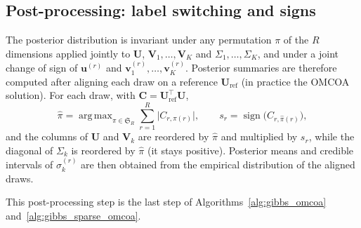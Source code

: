 \documentclass[11pt]{article}
\newtheorem{remark}{Remark}
\DeclareMathOperator*{\argmax}{arg\,max}
\newcommand{\U}{\mathbf{U}}
\newcommand{\V}{\mathbf{V}}
\newcommand{\uu}{\mathbf{u}}
\newcommand{\vv}{\mathbf{v}}
\begin{document}
\subsection{Post-processing: label switching and signs}\label{sec:align}

The posterior distribution is invariant under any permutation $\pi$ of the $R$ dimensions applied jointly to
$\U$, $\V_1,\ldots,\V_K$ and $\Sigma_1,\ldots,\Sigma_K$, and under a joint change of sign of $\uu^{(r)}$ and
$\vv_1^{(r)},\ldots,\vv_K^{(r)}$. Posterior summaries are therefore computed after aligning each draw on a reference
$\U_{\mathrm{ref}}$ (in practice the OMCOA solution). For each draw, with $\mathbf C=\U_{\mathrm{ref}}^\intercal\U$,
\[
  \hat\pi=\argmax_{\pi\in\mathfrak S_R}\sum_{r=1}^R\bigl|C_{r,\pi(r)}\bigr|,\qquad
  s_r=\operatorname{sign}\bigl(C_{r,\hat\pi(r)}\bigr),
\]
and the columns of $\U$ and $\V_k$ are reordered by $\hat\pi$ and multiplied by $s_r$, while the diagonal of
$\Sigma_k$ is reordered by $\hat\pi$ (it stays positive). Posterior means and credible intervals of $\sigma_k^{(r)}$
are then obtained from the empirical distribution of the aligned draws.

This post-processing step is the last step of Algorithms~\ref{alg:gibbs_omcoa} and~\ref{alg:gibbs_sparse_omcoa}.



\end{document}

